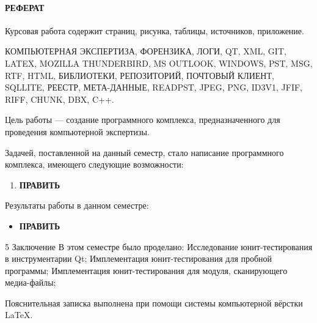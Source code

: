 \newpage
{}
\paragraph{\hfill РЕФЕРАТ \hfill}
Курсовая работа содержит  страниц,  рисунка,  таблицы,  источников,  приложение.

КОМПЬЮТЕРНАЯ ЭКСПЕРТИЗА, ФОРЕНЗИКА, ЛОГИ, QT, XML, GIT, LATEX, MOZILLA THUNDERBIRD, MS OUTLOOK, WINDOWS, PST, MSG, RTF, HTML, БИБЛИОТЕКИ, РЕПОЗИТОРИЙ, ПОЧТОВЫЙ КЛИЕНТ, SQLLITE, РЕЕСТР, МЕТА-ДАННЫЕ, READPST, JPEG, PNG, ID3V1, JFIF, RIFF, CHUNK, DBX, C++.

Цель работы --- создание программного комплекса, предназначенного для проведения компьютерной экспертизы.

Задачей, поставленной на данный семестр, стало написание программного комплекса, имеющего следующие возможности: 
\begin{enumerate}
\item \textbf{ПРАВИТЬ}
\end{enumerate}

Результаты работы в данном семестре:

\begin{itemize}
\item \textbf{ПРАВИТЬ}
\end{itemize}
5 Заключение
В этом семестре было проделано:
Исследование юнит-тестирования в инструментарии Qt;
Имплементация юнит-тестирования для пробной программы;
Имплементация юнит-тестирования для модуля, сканирующего медиа-файлы;

Пояснительная записка выполнена при помощи системы компьютерной вёрстки \LaTeX.

